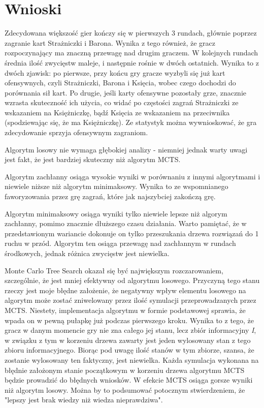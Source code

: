 \section{Wnioski}
Zdecydowana większość gier kończy się w pierwszych 3 rundach, głównie poprzez zagranie kart Strażniczki i Barona. Wynika z tego również, że gracz rozpoczynający ma znaczną przewagę nad drugim graczem. W kolejnych rundach średnia ilość zwycięstw maleje, i następnie rośnie w dwóch ostatnich. Wynika to z dwóch zjawisk: po pierwsze, przy końcu gry gracze wyzbyli się już kart ofensywnych, czyli Strażniczki, Barona i Księcia, wobec czego dochodzi do porównania sił kart. Po drugie, jeśli karty ofensywne pozostały grze, znacznie wzrasta skuteczność ich użycia, co widać po częstości zagrań Strażniczki ze wskazaniem na Księżniczkę, bądź Księcia ze wskazaniem na przeciwnika (spodziewając się, że ma Księżniczkę). Ze statystyk można wywnioskować, że gra zdecydowanie sprzyja ofensywnym zagraniom.

Algorytm losowy nie wymaga głębokiej analizy - niemniej jednak warty uwagi jest fakt, że jest bardziej skuteczny niż algorytm MCTS.

Algorytm zachłanny osiąga wysokie wyniki w porównaniu z innymi algorytmami i niewiele niższe niż algorytm minimaksowy. Wynika to ze wspomnianego faworyzowania przez grę zagrań, które jak najszybciej zakończą grę. 

Algorytm minimaksowy osiąga wyniki tylko niewiele lepsze niż algorym zachłanny, pomimo znacznie dłuższego czasu działania. Warto pamiętać, że w przedstawionym wariancie dokonuje on tylko przeszukania drzewa rozwiązań do 1 ruchu w przód. Algorytm ten osiąga przewagę nad zachłannym w rundach środkowych, jednak różnica zwycięstw jest niewielka.

Monte Carlo Tree Search okazał się być największym rozczarowaniem, szczególnie, że jest mniej efektywny od algorytmu losowego. Przyczyną tego stanu rzeczy jest moje błędne założenie, że negatywny wpływ elementu losowego na algorytm może zostać zniwelowany przez ilość symulacji przeprowadzanych przez MCTS. Niestety, implementacja algorytmu w formie podstawowej sprawia, że wpada on w pewną pułapkę już podczas pierwszego kroku. Wynika to z tego, że gracz w danym momencie gry nie zna całego jej stanu, lecz zbiór informacyjny \textit{I}, w związku z tym w korzeniu drzewa zawarty jest jeden wylosowany stan z tego zbioru informacyjnego. Biorąc pod uwagę ilość stanów w tym zbiorze, szansa, że zostanie wylosowany ten faktyczny, jest niewielka. Każda symulacja wykonana na błędnie założonym stanie początkowym w korzeniu drzewa algorytmu MCTS będzie prowadzić do błędnych wniosków. W efekcie MCTS osiąga gorsze wyniki niż algorytm losowy. Można by to podsumować potocznym stwierdzeniem, że "lepszy jest brak wiedzy niż wiedza nieprawdziwa".